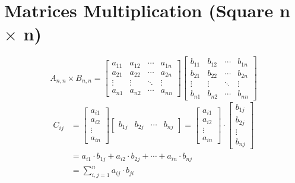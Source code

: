 \section*{Matrices Multiplication (Square n $\times$ n)}
\begin{equation*}
  A_{n,n} \times B_{n,n} =
 \begin{bmatrix}
  a_{11} & a_{12} & \cdots & a_{1n} \\
  a_{21} & a_{22} & \cdots & a_{2n} \\
  \vdots  & \vdots  & \ddots & \vdots  \\
  a_{n1} & a_{n2} & \cdots & a_{nn}
 \end{bmatrix}
  \begin{bmatrix}
  b_{11} & b_{12} & \cdots & b_{1n} \\
  b_{21} & b_{22} & \cdots & b_{2n} \\
  \vdots  & \vdots  & \ddots & \vdots  \\
  b_{n1} & b_{n2} & \cdots & b_{nn}
 \end{bmatrix}
\end{equation*}
\begin{align*}
  \label{eq:mmitem}
  C_{ij} & =  \begin{bmatrix}
                a_{i1} \\
                a_{i2} \\
                \vdots \\
                a_{in}
              \end{bmatrix}
              \begin{bmatrix}
                b_{1j} & b_{2j} & \cdots & b_{nj}
              \end{bmatrix} =
           \begin{bmatrix}
                a_{i1} \\
                a_{i2} \\
                \vdots \\
                a_{in}
           \end{bmatrix}
           \cdot
           \begin{bmatrix}
                b_{1j} \\
                b_{2j} \\
                \vdots \\
                b_{nj}
           \end{bmatrix} \\
         & = a_{i1}\cdot b_{1j}+a_{i2}\cdot b_{2j}+\cdots+a_{in}\cdot b_{nj} \\
         & = \sum_{i,j=1}^{n}a_{ij}\cdot b_{ji}
\end{align*}


